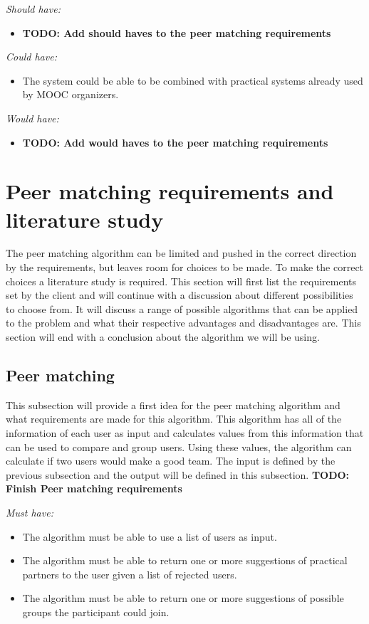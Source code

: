 \documentclass[]{article}
\newcommand{\TODO}[1]{{\color{red}\textbf{TODO: #1}}}
\newcommand{\reqr}[1]{{\noindent\emph{#1:}}}
\begin{document}
\reqr{Should have}
\begin{itemize}
\item \TODO{Add should haves to the peer matching requirements}
\end{itemize}

\reqr{Could have}
\begin{itemize}
\item The system could be able to be combined with practical systems already used by MOOC organizers.
\end{itemize}

\reqr{Would have}
\begin{itemize}
\item \TODO{Add would haves to the peer matching requirements}
\end{itemize}

\section{Peer matching requirements and literature study}
The peer matching algorithm can be limited and pushed in the correct direction by the requirements, but leaves room for choices to be made.
To make the correct choices a literature study is required.
This section will first list the requirements set by the client and will continue with a discussion about different possibilities to choose from.
It will discuss a range of possible algorithms that can be applied to the problem and what their respective advantages and disadvantages are.
This section will end with a conclusion about the algorithm we will be using.

\subsection{Peer matching}
This subsection will provide a first idea for the peer matching algorithm and what requirements are made for this algorithm.
This algorithm has all of the information of each user as input and calculates values from this information that can be used to compare and group users.
Using these values, the algorithm can calculate if two users would make a good team.
The input is defined by the previous subsection and the output will be defined in this subsection.
\TODO{Finish Peer matching requirements}

\reqr{Must have}
\begin{itemize}
\item The algorithm must be able to use a list of users as input.
\item The algorithm must be able to return one or more suggestions of practical partners to the user given a list of rejected users.
\item The algorithm must be able to return one or more suggestions of possible groups the participant could join.
\end{itemize}
\end{document}
